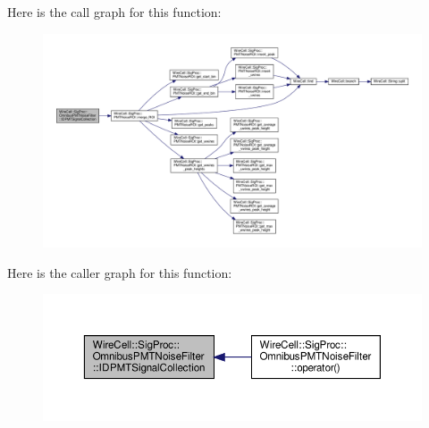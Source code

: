 Here is the call graph for this function\+:
\nopagebreak
\begin{figure}[H]
\begin{center}
\leavevmode
\includegraphics[width=350pt]{class_wire_cell_1_1_sig_proc_1_1_omnibus_p_m_t_noise_filter_a404245bd0dfdbd9447aecb5a19226df4_cgraph}
\end{center}
\end{figure}
Here is the caller graph for this function\+:
\nopagebreak
\begin{figure}[H]
\begin{center}
\leavevmode
\includegraphics[width=350pt]{class_wire_cell_1_1_sig_proc_1_1_omnibus_p_m_t_noise_filter_a404245bd0dfdbd9447aecb5a19226df4_icgraph}
\end{center}
\end{figure}
\mbox{\label{class_wire_cell_1_1_sig_proc_1_1_omnibus_p_m_t_noise_filter_af007f96c1c669926b51dce67928fbf60}} 
